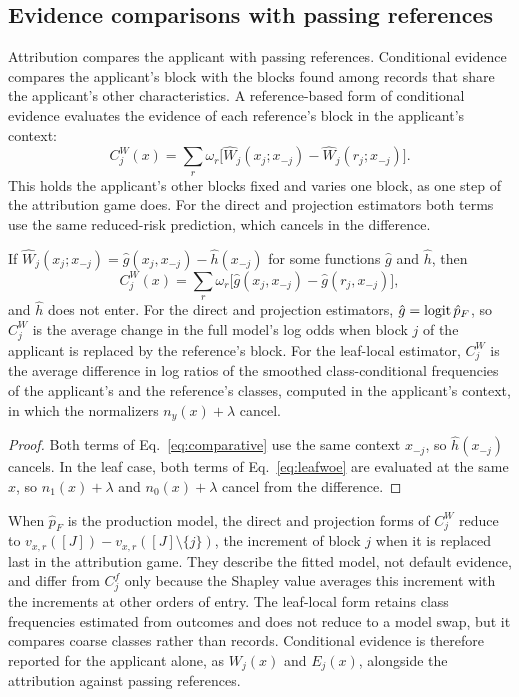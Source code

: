 \subsection{Evidence comparisons with passing references}

Attribution compares the applicant with passing references. Conditional evidence compares the applicant's block with the blocks found among records that share the applicant's other characteristics. A reference-based form of conditional evidence evaluates the evidence of each reference's block in the applicant's context:
\begin{equation}\label{eq:comparative}
C^W_j(x)=\sum_r\omega_r\bigl[\widehat W_j(x_j;x_{-j})-\widehat W_j(r_j;x_{-j})\bigr].
\end{equation}
This holds the applicant's other blocks fixed and varies one block, as one step of the attribution game does. For the direct and projection estimators both terms use the same reduced-risk prediction, which cancels in the difference.

\begin{proposition}\label{prop:collapse}
If $\widehat W_j(x_j;x_{-j})=\hat g(x_j,x_{-j})-\hat h(x_{-j})$ for some functions $\hat g$ and $\hat h$, then
\[
C^W_j(x)=\sum_r\omega_r\bigl[\hat g(x_j,x_{-j})-\hat g(r_j,x_{-j})\bigr],
\]
and $\hat h$ does not enter. For the direct and projection estimators, $\hat g=\operatorname{logit}\hat p_F$, so $C^W_j$ is the average change in the full model's log odds when block $j$ of the applicant is replaced by the reference's block. For the leaf-local estimator, $C^W_j$ is the average difference in log ratios of the smoothed class-conditional frequencies of the applicant's and the reference's classes, computed in the applicant's context, in which the normalizers $n_y(x)+\lambda$ cancel.
\end{proposition}
\begin{proof}
Both terms of Eq.~\eqref{eq:comparative} use the same context $x_{-j}$, so $\hat h(x_{-j})$ cancels. In the leaf case, both terms of Eq.~\eqref{eq:leafwoe} are evaluated at the same $x$, so $n_1(x)+\lambda$ and $n_0(x)+\lambda$ cancel from the difference.
\end{proof}

When $\hat p_F$ is the production model, the direct and projection forms of $C^W_j$ reduce to $v_{x,r}([J])-v_{x,r}([J]\setminus\{j\})$, the increment of block $j$ when it is replaced last in the attribution game. They describe the fitted model, not default evidence, and differ from $C^f_j$ only because the Shapley value averages this increment with the increments at other orders of entry. The leaf-local form retains class frequencies estimated from outcomes and does not reduce to a model swap, but it compares coarse classes rather than records. Conditional evidence is therefore reported for the applicant alone, as $W_j(x)$ and $E_j(x)$, alongside the attribution against passing references.

